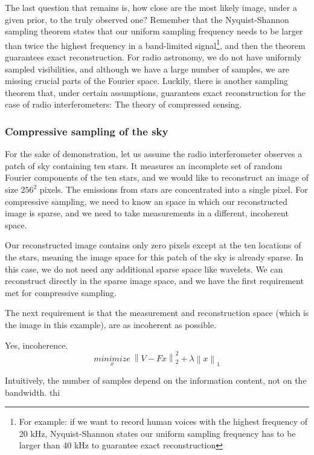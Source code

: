The last question that remains is, how close are the most likely image, under a given prior, to the truly observed one? Remember that the Nyquist-Shannon sampling theorem states that our uniform sampling frequency needs to be larger than twice the highest frequency in a band-limited signal\footnote{For example: if we want to record human voices with the highest frequency of 20 kHz, Nyquist-Shannon states our uniform sampling frequency has to be larger than 40 kHz to guarantee exact reconstruction}, and then the theorem guarantees exact reconstruction. For radio astronomy, we do not have uniformly sampled visibilities, and although we have a large number of samples, we are missing crucial parts of the Fourier space. Luckily, there is another sampling theorem that, under certain assumptions, guarantees exact reconstruction for the case of radio interferometers: The theory of compressed sensing.

\subsubsection{Compressive sampling of the sky}
For the sake of demonstration, let us assume the radio interferometer observes a patch of sky containing ten stars. It measures an incomplete set of random Fourier components of the ten stars, and we would like to reconstruct an image of size $256^2$ pixels. The emissions from stars are concentrated into a single pixel. For compressive sampling, we need to know an space in which our reconstructed image is sparse, and we need to take measurements in a different, incoherent space.

Our reconstructed image contains only zero pixels except at the ten locations of the stars, meaning the image space for this patch of the sky is already sparse. In this case, we do not need any additional sparse space like wavelets. We can reconstruct directly in the sparse image space, and we have the first requirement met for compressive sampling. 

The next requirement is that the measurement and reconstruction space (which is the image in this example), are as incoherent as possible. 

Yes, incoherence.
\begin{equation}\label{intro:linear:compressed2}
\underset{x}{minimize} \: \left \| V - Fx \right \|_2^2 + \lambda \left \| x \right \|_1
\end{equation}


Intuitively, the number of samples depend on the information content, not on the bandwidth. thi


